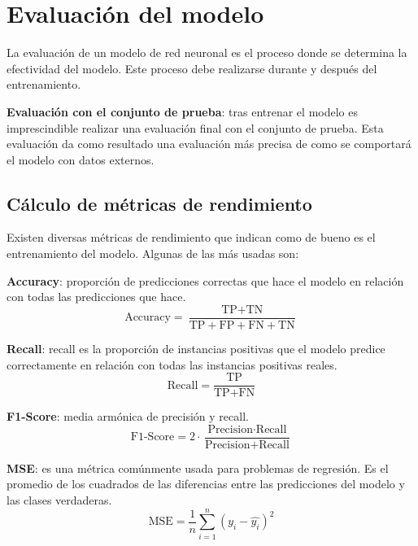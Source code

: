 \section{Evaluación del modelo}
La evaluación de un modelo de red neuronal es el proceso donde se determina la efectividad del modelo. Este proceso debe realizarse durante y después del entrenamiento.

\textbf{Evaluación con el conjunto de prueba}: tras entrenar el modelo es imprescindible realizar una evaluación final con el conjunto de prueba. Esta evaluación da como resultado una evaluación más precisa de como se comportará el modelo con datos externos.

\subsection{Cálculo de métricas de rendimiento}
Existen diversas métricas de rendimiento que indican como de bueno es el entrenamiento del modelo. Algunas de las más usadas son:

\textbf{Accuracy}: proporción de predicciones correctas que hace el modelo en relación con todas las predicciones que hace.
\begin{equation}
\text{Accuracy} = \frac{\text{TP} + \text{TN}}{\text{TP} + \text{FP} + \text{FN} + \text{TN}}
\end{equation}

\textbf{Recall}: recall es la proporción de instancias positivas que el modelo predice correctamente en relación con todas las instancias positivas reales.
\begin{equation}
\text{Recall} = \frac{\text{TP}}{\text{TP} + \text{FN}}
\end{equation}

\textbf{F1-Score}: media armónica de precisión y recall.
\begin{equation}
\text{F1-Score} = 2 \cdot \frac{\text{Precision} \cdot \text{Recall}}{\text{Precision} + \text{Recall}}
\end{equation}

\textbf{MSE}: es una métrica comúnmente usada para problemas de regresión. Es el promedio de los cuadrados de las diferencias entre las predicciones del modelo y las clases verdaderas.
\begin{equation}
\text{MSE} = \frac{1}{n} \sum_{i=1}^{n} (y_i - \hat{y_i})^2
\end{equation}
